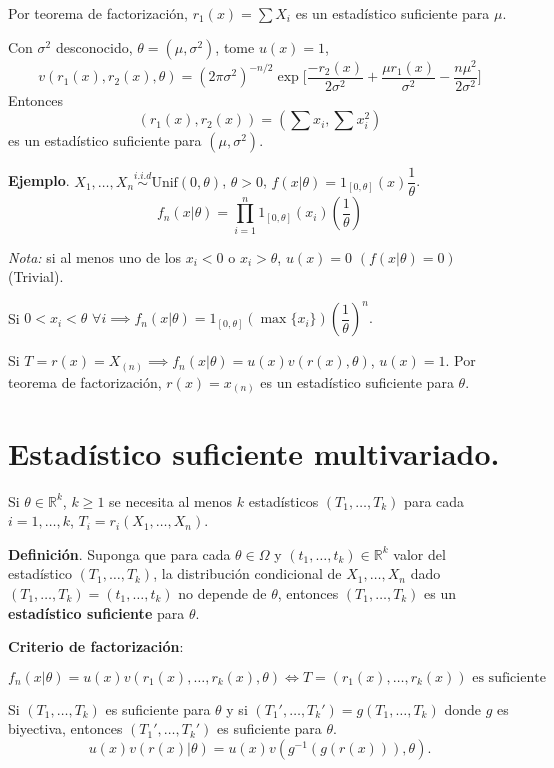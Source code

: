 \documentclass[
  12pt,
]{book}
\begin{document}
Por teorema de factorización, \(r_{1}(x)=\sum X_i\) es un estadístico suficiente para \(\mu\).

Con \(\sigma^2\) desconocido, \(\theta = (\mu,\sigma^2)\), tome \(u(x) = 1\),
\[ v(r_1(x),r_2(x),\theta) = (2\pi\sigma^2)^{-n/2}\exp\bigg[\dfrac{-r_2(x)}{2\sigma^2} + \dfrac{\mu r_1(x)}{\sigma^2}- \dfrac{n\mu^2}{2\sigma^2}\bigg] \]
Entonces
\[ (r_1(x),r_2(x)) = \left(\sum{x_i},\sum x_i ^2\right) \]
es un estadístico suficiente para \((\mu, \sigma^2)\).

\textbf{Ejemplo}. \(X_1,\dots, X_n \stackrel{i.i.d}{\sim}\text{Unif}(0,\theta)\), \(\theta>0\), \(f(x|\theta) = 1_{[0,\theta]}(x)\dfrac 1\theta\).
\[f_n(x|\theta) = \prod_{i=1}^n 1_{[0,\theta]}(x_i)\left(\dfrac 1\theta \right) \]

\emph{Nota:} si al menos uno de los \(x_i<0\) o \(x_i>\theta\), \(u(x) = 0\) \((f(x|\theta) = 0)\) (Trivial).

Si \(0<x_i<\theta\) \(\forall i \implies f_n(x|\theta) = 1_{[0,\theta]}(\max\{x_i\})\left(\dfrac 1\theta \right)^n.\)

Si \(T = r(x) = X_{(n)} \implies f_n(x|\theta) = u(x)v(r(x),\theta)\), \(u(x) = 1\). Por teorema de factorización, \(r(x) = x_{(n)}\) es un estadístico suficiente para \(\theta\).

\hypertarget{estaduxedstico-suficiente-multivariado.}{%
\section{Estadístico suficiente multivariado.}\label{estaduxedstico-suficiente-multivariado.}}

Si \(\theta \in \mathbb R^k\), \(k\geq 1\) se necesita al menos \(k\) estadísticos
\((T_1,\dots,T_k)\) para cada \(i=1,\dots,k\), \(T_i = r_i(X_1,\dots, X_n)\).

\textbf{Definición}. Suponga que para cada \(\theta\in \Omega\) y \((t_1,\dots, t_k) \in \mathbb R^k\) valor del estadístico \((T_1,\dots,T_k)\), la distribución condicional de
\(X_1,\dots, X_n\) dado \((T_1,\dots,T_k) = (t_1,\dots, t_k)\) no depende de
\(\theta\), entonces \((T_1,\dots,T_k)\) es un \textbf{estadístico suficiente} para
\(\theta\).

\textbf{Criterio de factorización}:

\[ f_n(x|\theta) = u(x)v(r_1(x),\dots,r_k(x),\theta) \Leftrightarrow T = (r_1(x),\dots,r_k(x)) \text{ es
suficiente}\]

Si \((T_1,\dots,T_k)\) es suficiente para \(\theta\) y si \((T_1',\dots,T_k') = g(T_1,\dots,T_k)\) donde \(g\) es biyectiva, entonces \((T_1',\dots,T_k')\) es
suficiente para \(\theta\). \[ u(x)v(r(x)|\theta) = u(x)v(g^{-1}(g(r(x))),\theta).\]
\end{document}

